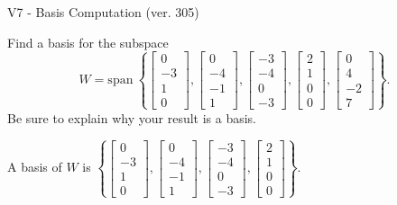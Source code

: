\begin{exercise}
  \begin{exerciseTitle}V7 - Basis Computation (ver. 305)\end{exerciseTitle}
  \begin{exerciseStatement}
    Find a basis for the subspace 
\[W=\mathrm{span}\ \left\{\left[\begin{array}{r}
0 \\
-3 \\
1 \\
0
\end{array}\right] , \left[\begin{array}{r}
0 \\
-4 \\
-1 \\
1
\end{array}\right] , \left[\begin{array}{r}
-3 \\
-4 \\
0 \\
-3
\end{array}\right] , \left[\begin{array}{r}
2 \\
1 \\
0 \\
0
\end{array}\right] , \left[\begin{array}{r}
0 \\
4 \\
-2 \\
7
\end{array}\right]\right\}.\]
 Be sure to explain why your result is a basis.


  \end{exerciseStatement}
  \begin{exerciseAnswer}
   A basis of \(W\) is  \(\left\{\left[\begin{array}{r}
0 \\
-3 \\
1 \\
0
\end{array}\right] , \left[\begin{array}{r}
0 \\
-4 \\
-1 \\
1
\end{array}\right] , \left[\begin{array}{r}
-3 \\
-4 \\
0 \\
-3
\end{array}\right] , \left[\begin{array}{r}
2 \\
1 \\
0 \\
0
\end{array}\right]\right\}\).
  


  \end{exerciseAnswer}
\end{exercise}